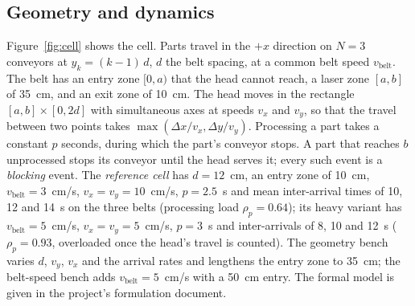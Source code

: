 \documentclass[11pt,a4paper]{article}
\newcommand{\vb}{v_{\mathrm{belt}}}
\begin{document}
\subsection{Geometry and dynamics}
Figure~\ref{fig:cell} shows the cell. Parts travel in the $+x$ direction on $N=3$
conveyors at $y_k=(k-1)\,d$, $d$ the belt spacing, at a common belt speed $\vb$. The belt
has an entry zone $[0,a)$ that the head cannot reach, a laser zone $[a,b]$ of 35~cm, and
an exit zone of 10~cm. The head moves in the rectangle $[a,b]\times[0,2d]$ with
simultaneous axes at speeds $v_x$ and $v_y$, so that the travel between two points takes
$\max(\Delta x/v_x,\Delta y/v_y)$. Processing a part takes a constant $p$ seconds, during
which the part's conveyor stops. A part that reaches $b$ unprocessed stops its conveyor
until the head serves it; every such event is a \emph{blocking} event. The \emph{reference
cell} has $d=12$~cm, an entry zone of 10~cm, $\vb=3$~cm/s, $v_x=v_y=10$~cm/s, $p=2.5$~s
and mean inter-arrival times of 10, 12 and 14~s on the three belts (processing load
$\rho_p=0.64$); its heavy variant has $\vb=5$~cm/s, $v_x=v_y=5$~cm/s, $p=3$~s and
inter-arrivals of 8, 10 and 12~s ($\rho_p=0.93$, overloaded once the head's travel is
counted). The geometry bench varies $d$, $v_y$, $v_x$ and the arrival rates and lengthens
the entry zone to 35~cm; the belt-speed bench adds $\vb=5$~cm/s with a 50~cm entry. The
formal model is given in the project's formulation document.
\end{document}
